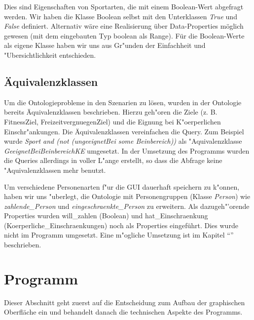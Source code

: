 Dies sind Eigenschaften von Sportarten, die mit einem Boolean-Wert abgefragt werden. Wir haben die Klasse Boolean selbst mit den Unterklassen \textit{True} und \textit{False} definiert. Alternativ w\"are eine Realisierung \"uber Data-Properties m\"oglich gewesen (mit dem eingebauten Typ boolean als Range). Für die Boolean-Werte als eigene Klasse haben wir uns aus Gr"unden der Einfachheit und "Ubersichtlichkeit entschieden. 

\subsection{\"Aquivalenzklassen}

Um die Ontologieprobleme in den Szenarien zu l\"osen, wurden in der Ontologie bereits \"Aquivalenzklassen beschrieben. 
Hierzu geh"oren die Ziele (z. B. FitnessZiel, FreizeitvergnuegenZiel) und die Eignung bei K"oerperlichen Einschr"ankungen.
Die Äquivalenzklassen vereinfachen die Query. Zum Beispiel wurde \textit{Sport and (not (ungeeignetBei some Beinbereich))} als "Aquivalenzklasse \textit{GeeignetBeiBeinbereichKE} umgesetzt. In der Umsetzung des Programms wurden die Queries allerdings in voller L"ange erstellt, so dass die Abfrage keine "Aquivalenzklassen mehr benutzt. 


Um verschiedene Personenarten f"ur die GUI dauerhaft speichern zu k"onnen, haben wir uns "uberlegt, die Ontologie mit Personengruppen (Klasse \textit{Person}) wie \textit{zahlende\_Person} und \textit{eingeschraenkte\_Person} zu erweitern. Als dazugeh"'orende Properties wurden will\_zahlen (Boolean) und hat\_Einschraenkung (Koerperliche\_Einschraenkungen) noch als Properties eingeführt. Dies wurde nicht im Programm umgesetzt. Eine m"ogliche Umsetzung ist im Kapitel "`"' beschrieben.

\section{Programm}

Dieser Abschnitt geht zuerst auf die Entscheidung zum Aufbau der graphischen Oberfl\"ache ein und behandelt danach die technischen Aspekte des Programms. 

